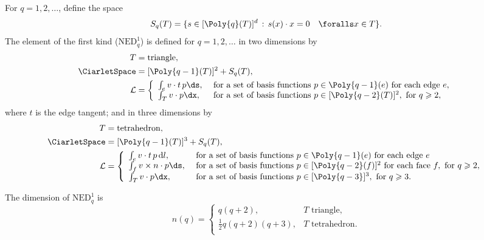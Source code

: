 \begin{definition}
  For $q = 1, 2, \dots$, define the space
  \begin{equation}
    S_{q}(T) = \{ s \in [\Poly{q}(T)]^d \, : \, s(x) \cdot x = 0 \quad
    \foralls x \in T\}.
  \end{equation}
  The \nedelec{} element of the first kind ($\mathrm{NED}^1_q$) is
  defined for $q = 1, 2, \dots$ in two dimensions by
  \begin{align}
    T &= \mathrm{triangle}{}, \\
    \CiarletSpace &= [\Poly{q-1}(T)]^2 + S_{q}(T), \\
    \mathcal{L} &=
    \left \{
    \begin{array}{ll}
      \int_{e} v \cdot t \, p \ds,
      &\text{ for a set of basis functions }  p \in \Poly{q-1}(e)
      \text{ for each edge } e, \\
      \int_{T} v \cdot  p \dx,
      &\text{ for a set of basis functions } p \in [\Poly{q-2}(T)]^2,
      \text{ for } q \geqslant 2, \\
    \end{array}
    \right.
  \end{align}
  where $t$ is the edge tangent; and in three dimensions by
  \begin{align}
    T &= \mathrm{tetrahedron}{}, \\
    \CiarletSpace &= [\Poly{q-1}(T)]^3 + S_{q}(T), \\
    \mathcal{L} &=
    \left \{
    \begin{array}{ll}
      \int_{e} v \cdot t \, p \,\mathrm{d}l,
      &\text{ for a set of basis functions } p \in \Poly{q-1}(e)
      \text{ for each edge } e \\
      \int_{f} v \times n \cdot p \ds,
      &\text{ for a set of basis functions } p \in [\Poly{q-2}(f)]^2
      \text{ for each face } f, \text{ for } q \geqslant 2, \\
      \int_{T} v \cdot p \dx,
      &\text{ for a set of basis functions } p \in [\Poly{q-3}]^3,
      \text{ for } q \geqslant 3. \\
    \end{array}
    \right .
  \end{align}
\end{definition}
The dimension of $\mathrm{NED}^1_q$ is
\begin{equation}
  n(q) = \left \{
  \begin{array}{ll}
  q (q + 2), & T \text{ triangle}, \\
  \frac{1}{2} q(q+2)(q+3), & T \text{ tetrahedron}.\\
  \end{array}
  \right .
\end{equation}

